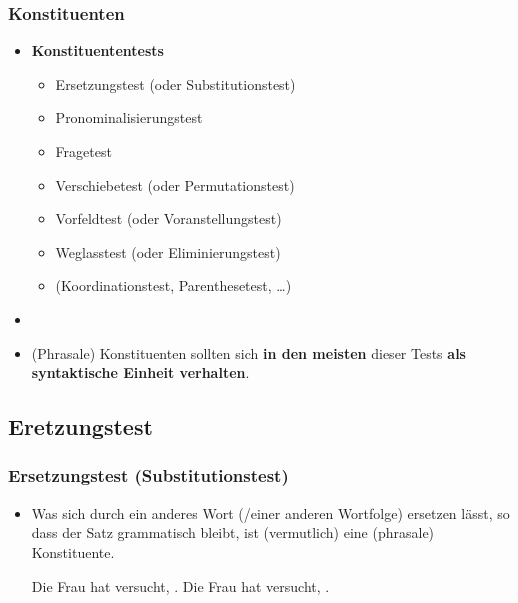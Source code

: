 \begin{frame}
\frametitle{Konstituenten}

\begin{itemize}

	\item \textbf{Konstituententests} \citep[vgl.][]{MyP18a}
	\begin{itemize}
		\item Ersetzungstest (oder Substitutionstest)
		\item Pronominalisierungstest
		\item Fragetest
		\item Verschiebetest (oder Permutationstest)
		\item Vorfeldtest (oder Voranstellungstest) 
		\item Weglasstest (oder Eliminierungstest)
		\item (Koordinationstest, Parenthesetest, \dots )
	\end{itemize}
	\item[]
	\item (Phrasale) Konstituenten sollten sich \textbf{in den meisten} dieser Tests \textbf{als syntaktische Einheit verhalten}.

\end{itemize}

\end{frame}


\subsection{Eretzungstest}

\begin{frame}
\frametitle{Ersetzungstest (Substitutionstest)}

\begin{itemize}
	\item Was sich durch ein anderes Wort (/einer anderen Wortfolge) ersetzen lässt, so dass der Satz grammatisch bleibt, ist (vermutlich) eine (phrasale) Konstituente.

	\eal 
	\zl

\pause	
	\eal 
	\ex Die Frau hat versucht, .
	\ex Die Frau hat versucht, .
	\zl
	
\end{itemize}

\end{frame}


